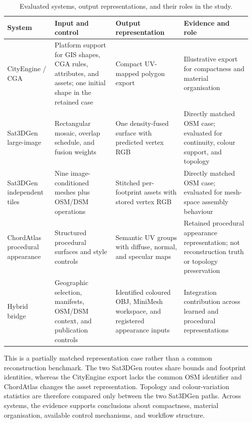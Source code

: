 \begin{table}[H]
\centering
\caption{Evaluated systems, output representations, and their roles in the
study.}
\label{tab:paradigm-comparison}
\footnotesize
\begin{tabularx}{\textwidth}{>{\raggedright\arraybackslash}p{}
>{\raggedright\arraybackslash}X>{\raggedright\arraybackslash}X
>{\raggedright\arraybackslash}X}
\toprule
System & Input and control & Output representation & Evidence and role\\
\midrule
CityEngine / CGA & Platform support for GIS shapes, CGA rules, attributes, and
assets; one initial shape in the retained case & Compact UV-mapped polygon
export & Illustrative export for compactness and material organisation\\
Sat3DGen large-image & Rectangular mosaic, overlap schedule, and fusion weights
& One density-fused surface with predicted vertex RGB & Directly matched OSM
case; evaluated for continuity, colour support, and topology\\
Sat3DGen independent tiles & Nine image-conditioned meshes plus OSM/DSM
operations & Stitched per-footprint assets with stored vertex RGB & Directly
matched OSM case; evaluated for mesh-space assembly behaviour\\
ChordAtlas procedural appearance & Structured procedural surfaces and style
controls & Semantic UV groups with diffuse, normal, and specular maps &
Retained procedural appearance representation; not reconstruction truth or topology
preservation\\
Hybrid bridge & Geographic selection, manifests, OSM/DSM context, and
publication controls & Identified coloured OBJ, MiniMesh workspace, and
registered appearance inputs & Integration contribution across learned and
procedural representations\\
\bottomrule
\end{tabularx}
\end{table}

This is a partially matched representation case rather than a common reconstruction
benchmark.  The two Sat3DGen routes share bounds and footprint identities,
whereas the CityEngine export lacks the common OSM identifier and ChordAtlas
changes the asset representation.  Topology and colour-variation statistics
are therefore compared only between the two Sat3DGen paths.  Across systems,
the evidence supports conclusions about compactness, material organisation,
available control mechanisms, and workflow structure.

